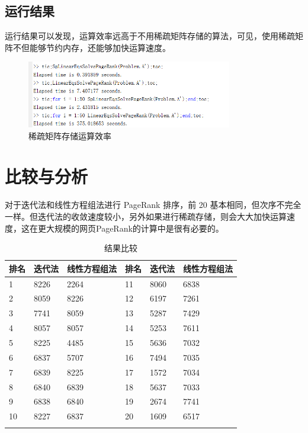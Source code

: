 \documentclass[a4paper,left=2.5cm,right=2.5cm]{article}
\begin{document}
\begin{spacing}{1.6}
	\subsection{运行结果}
	运行结果可以发现，运算效率远高于不用稀疏矩阵存储的算法，可见，使用稀疏矩阵不但能够节约内存，还能够加快运算速度。
	\begin{figure}[H]
		\includegraphics[width=0.8\textwidth]{image/result_sp1.png}
		\caption{稀疏矩阵存储运算效率}
	\end{figure}
	\section{比较与分析}
	对于迭代法和线性方程组法进行 PageRank 排序，前 20 基本相同，但次序不完全一样。但迭代法的收敛速度较小，另外如果进行稀疏存储，则会大大加快运算速度，这在更大规模的网页PageRank的计算中是很有必要的。
	\begin{longtable}{|lll||lll|}
		\hline
		排名&迭代法 & 线性方程组法& 排名&迭代法&线性方程组法\\
		\hline
		1	&	8226	&	2264	&	11	&	8060	&	6838	\\
		2	&	8059	&	8226	&	12	&	6197	&	7261	\\
		3	&	7741	&	8059	&	13	&	5287	&	7429	\\
		4	&	8057	&	8057	&	14	&	5253	&	7611	\\
		5	&	8225	&	4485	&	15	&	5636	&	7032	\\
		6	&	6837	&	5707	&	16	&	7494	&	7035	\\
		7	&	6839	&	8225	&	17	&	1572	&	7034	\\
		8	&	6840	&	6839	&	18	&	5637	&	7033	\\
		9	&	6838	&	6840	&	19	&	2674	&	7741	\\
		10	&	8227	&	6837	&	20	&	1609	&	6517	\\
		\hline
		\caption{结果比较}
	\end{longtable}
	\end{spacing}
	
\end{document}
